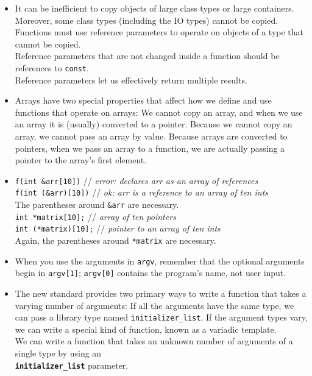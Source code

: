 \begin{itemize}
\item
It can be inefficient to copy objects of large class types or large containers. Moreover, some class types (including the IO types) cannot be copied. Functions must use reference parameters to operate on objects of a type that cannot be copied.\\
Reference parameters that are not changed inside a function should be references to \texttt{const}.\\
Reference parameters let us effectively return multiple results.

\item
Arrays have two special properties that affect how we define and use functions that operate on arrays: We cannot copy an array, and when we use an array it is (usually) converted to a pointer. Because we cannot copy an array, we cannot pass an array by value. Because arrays are converted to pointers, when we pass an array to a function, we are actually passing a pointer to the array's first element.

\item
\hspace*{1em}\texttt{f(int \&arr[10])} // \textit{error: declares arr as an array of references}\\
\hspace*{1em}\texttt{f(int (\&arr)[10])} // \textit{ok: arr is a reference to an array of ten ints}\\
The parentheses around \texttt{\&arr} are necessary.\\
\hspace*{1em}\texttt{int *matrix[10];} // \textit{array of ten pointers}\\
\hspace*{1em}\texttt{int (*matrix)[10];} // \textit{pointer to an array of ten ints}\\
Again, the parentheses around \texttt{*matrix} are necessary.

\item
When you use the arguments in \texttt{argv}, remember that the optional arguments begin in \texttt{argv[1]}; \texttt{argv[0]} contains the program's name, not user input.

\item
The new standard provides two primary ways to write a function that takes a varying number of arguments: If all the arguments have the same type, we can pass a library type named \texttt{initializer\_list}. If the argument types vary, we can write a special kind of function, known as a variadic template.\\
We can write a function that takes an unknown number of arguments of a single type by using an\\
\textbf{\texttt{initializer\_list}} parameter.


\end{itemize}
